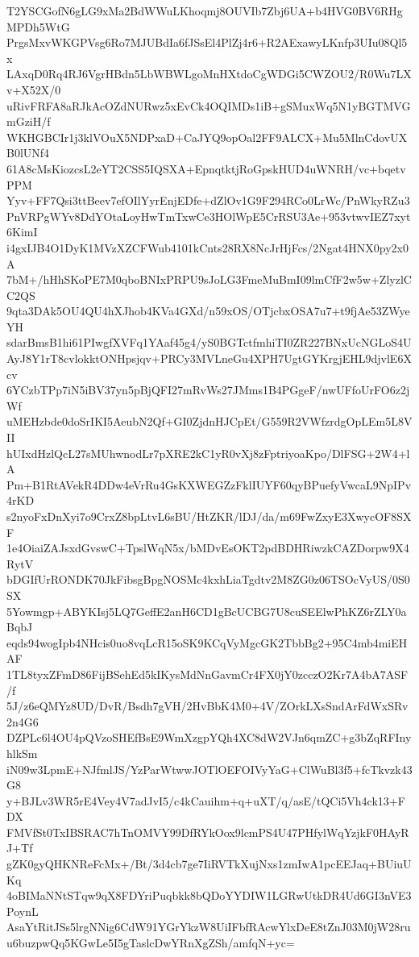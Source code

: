 T2YSCGofN6gLG9xMa2BdWWuLKhoqmj8OUVIb7Zbj6UA+b4HVG0BV6RHgMPDh5WtG
PrgsMxvWKGPVsg6Ro7MJUBdIa6fJSsEl4PlZj4r6+R2AExawyLKnfp3UIu08Ql5x
LAxqD0Rq4RJ6VgrHBdn5LbWBWLgoMnHXtdoCgWDGi5CWZOU2/R0Wu7LXv+X52X/0
uRivFRFA8aRJkAcOZdNURwz5xEvCk4OQIMDs1iB+gSMuxWq5N1yBGTMVGmGziH/f
WKHGBCIr1j3klVOuX5NDPxaD+CaJYQ9opOal2FF9ALCX+Mu5MlnCdovUXB0lUNf4
61A8cMsKiozcsL2eYT2CSS5IQSXA+EpnqtktjRoGpskHUD4uWNRH/vc+bqetvPPM
Yyv+FF7Qsi3ttBeev7efOIlYyrEnjEDfe+dZlOv1G9F294RCo0LrWc/PnWkyRZu3
PnVRPgWYv8DdYOtaLoyHwTmTxwCe3HOlWpE5CrRSU3Ae+953vtwvIEZ7xyt6KimI
i4gxIJB4O1DyK1MVzXZCFWub4101kCnts28RX8NcJrHjFcs/2Ngat4HNX0py2x0A
7bM+/hHhSKoPE7M0qboBNIxPRPU9sJoLG3FmeMuBmI09lmCfF2w5w+ZlyzlCC2QS
9qta3DAk5OU4QU4hXJhob4KVa4GXd/n59xOS/OTjcbxOSA7u7+t9fjAe53ZWyeYH
sdarBmsB1hi61PIwgfXVFq1YAaf45g4/yS0BGTctfmhiTI0ZR227BNxUcNGLoS4U
AyJ8Y1rT8cvlokktONHpsjqv+PRCy3MVLneGu4XPH7UgtGYKrgjEHL9djvlE6Xcv
6YCzbTPp7iN5iBV37yn5pBjQFI27mRvWs27JMms1B4PGgeF/nwUFfoUrFO6z2jWf
uMEHzbde0doSrIKI5AeubN2Qf+GI0ZjdnHJCpEt/G559R2VWfzrdgOpLEm5L8VII
hUIxdHzlQcL27sMUhwnodLr7pXRE2kC1yR0vXj8zFptriyoaKpo/DlFSG+2W4+lA
Pm+B1RtAVekR4DDw4eVrRu4GsKXWEGZzFklIUYF60qyBPuefyVwcaL9NpIPv4rKD
s2nyoFxDnXyi7o9CrxZ8bpLtvL6sBU/HtZKR/lDJ/da/m69FwZxyE3XwycOF8SXF
1e4OiaiZAJsxdGvswC+TpslWqN5x/bMDvEsOKT2pdBDHRiwzkCAZDorpw9X4RytV
bDGIfUrRONDK70JkFibsgBpgNOSMc4kxhLiaTgdtv2M8ZG0z06TSOcVyUS/0S0SX
5Yowmgp+ABYKIsj5LQ7GeffE2anH6CD1gBcUCBG7U8cuSEElwPhKZ6rZLY0aBqbJ
eqds94wogIpb4NHcis0uo8vqLcR15oSK9KCqVyMgcGK2TbbBg2+95C4mb4miEHAF
1TL8tyxZFmD86FijBSehEd5kIKysMdNnGavmCr4FX0jY0zcczO2Kr7A4bA7ASF/f
5J/z6eQMYz8UD/DvR/Bsdh7gVH/2HvBbK4M0+4V/ZOrkLXsSndArFdWxSRv2n4G6
DZPLc6l4OU4pQVzoSHEfBsE9WmXzgpYQh4XC8dW2VJn6qmZC+g3bZqRFInyhlkSm
iN09w3LpmE+NJfmlJS/YzParWtwwJOTlOEFOIVyYaG+ClWuBl3f5+fcTkvzk43G8
y+BJLv3WR5rE4Vey4V7adJvI5/c4kCauihm+q+uXT/q/asE/tQCi5Vh4ck13+FDX
FMVfSt0TxIBSRAC7hTnOMVY99DfRYkOox9lcmPS4U47PHfylWqYzjkF0HAyRJ+Tf
gZK0gyQHKNReFcMx+/Bt/3d4cb7ge7IiRVTkXujNxs1zmIwA1pcEEJaq+BUiuUKq
4oBIMaNNtSTqw9qX8FDYriPuqbkk8bQDoYYDIW1LGRwUtkDR4Ud6GI3nVE3PoynL
AsaYtRitJSs5lrgNNig6CdW91YGrYkzW8UiIFbfRAcwYlxDeE8tZnJ03M0jW28ru
u6buzpwQq5KGwLe5I5gTaslcDwYRnXgZSh/amfqN+yc=
